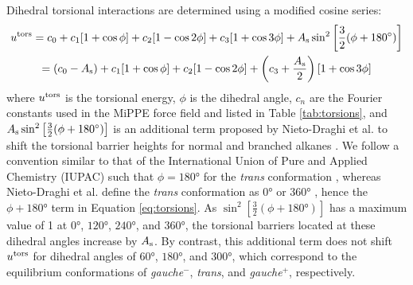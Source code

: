 \documentclass[preprint,review,12pt]{elsarticle}
\begin{document}
	
	Dihedral torsional interactions are determined using a modified cosine series:
	\begin{multline} \label{eq:torsions}
	u^{\rm tors} = c_0 + c_1 [1+\cos{\phi}] + c_2 [1-\cos{2\phi}] + c_3 [1+\cos{3\phi}] + A_{\rm s} \sin^2\left[\frac{3}{2}(\phi + \ang{180})\right] \\ = (c_0 - A_{\rm s}) + c_1 [1+\cos{\phi}] + c_2 [1-\cos{2\phi}] + \left(c_3 + \frac{A_{\rm s}}{2}\right) [1+\cos{3\phi}]
	\end{multline}
	where $u^{\rm tors}$ is the torsional energy, $\phi$ is the dihedral angle, $c_n$ are the Fourier constants used in the MiPPE force field and listed in Table \ref{tab:torsions}, and $A_{\rm s} \sin^2\left[\frac{3}{2}(\phi + \ang{180})\right]$ is an additional term proposed by Nieto-Draghi et al. to shift the torsional barrier heights for normal and branched alkanes \cite{Nieto2006,Nieto2008}. We follow a convention similar to that of the International Union of Pure and Applied Chemistry (IUPAC) such that $\phi = \ang{180}$ for the \textit{trans} conformation \cite{Martin1999}, whereas Nieto-Draghi et al. define the \textit{trans} conformation as $\ang{0}$ or $\ang{360}$ \cite{Nieto2006,Nieto2008}, hence the $\phi+\ang{180}$ term in Equation \ref{eq:torsions}. As $\sin^2\left[\frac{3}{2}(\phi + \ang{180})\right]$ has a maximum value of 1 at $\ang{0}$, $\ang{120}$, $\ang{240}$, and $\ang{360}$, the torsional barriers located at these dihedral angles increase by $A_{\rm s}$. By contrast, this additional term does not shift $u^{\rm tors}$ for dihedral angles of $\ang{60}$, $\ang{180}$, and $\ang{300}$, which correspond to the equilibrium conformations of \textit{gauche}$^-$, \textit{trans}, and \textit{gauche}$^+$, respectively. 
		
\end{document}
